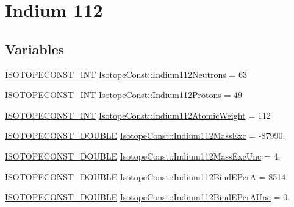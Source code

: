 \hypertarget{group___isotope_const-_indium-_in112}{}\section{Indium 112}
\label{group___isotope_const-_indium-_in112}
\subsection*{Variables}
\begin{DoxyCompactItemize}
\item 
\mbox{\hyperlink{group___isotope_const-_macros_ga5f18360b3e99483a35c32d789e62621c}{I\+S\+O\+T\+O\+P\+E\+C\+O\+N\+S\+T\+\_\+\+I\+NT}} \mbox{\hyperlink{group___isotope_const-_indium-_in112_gae919727f6b3f5c80d8d23961eab32aa6}{Isotope\+Const\+::\+Indium112\+Neutrons}} = 63
\item 
\mbox{\hyperlink{group___isotope_const-_macros_ga5f18360b3e99483a35c32d789e62621c}{I\+S\+O\+T\+O\+P\+E\+C\+O\+N\+S\+T\+\_\+\+I\+NT}} \mbox{\hyperlink{group___isotope_const-_indium-_in112_gaa73dd163a5b96491471405d681070d68}{Isotope\+Const\+::\+Indium112\+Protons}} = 49
\item 
\mbox{\hyperlink{group___isotope_const-_macros_ga5f18360b3e99483a35c32d789e62621c}{I\+S\+O\+T\+O\+P\+E\+C\+O\+N\+S\+T\+\_\+\+I\+NT}} \mbox{\hyperlink{group___isotope_const-_indium-_in112_ga358c507648f335595f76f39b1484c5a2}{Isotope\+Const\+::\+Indium112\+Atomic\+Weight}} = 112
\item 
\mbox{\hyperlink{group___isotope_const-_macros_ga8f45a7272ce02c0b4c65c44636ed719a}{I\+S\+O\+T\+O\+P\+E\+C\+O\+N\+S\+T\+\_\+\+D\+O\+U\+B\+LE}} \mbox{\hyperlink{group___isotope_const-_indium-_in112_ga10a142a463d1334fd455675d1e0e811d}{Isotope\+Const\+::\+Indium112\+Mass\+Exc}} = -\/87990.
\item 
\mbox{\hyperlink{group___isotope_const-_macros_ga8f45a7272ce02c0b4c65c44636ed719a}{I\+S\+O\+T\+O\+P\+E\+C\+O\+N\+S\+T\+\_\+\+D\+O\+U\+B\+LE}} \mbox{\hyperlink{group___isotope_const-_indium-_in112_ga80f90ef726d9a6c1fa15e2dfb15f4c8e}{Isotope\+Const\+::\+Indium112\+Mass\+Exc\+Unc}} = 4.
\item 
\mbox{\hyperlink{group___isotope_const-_macros_ga8f45a7272ce02c0b4c65c44636ed719a}{I\+S\+O\+T\+O\+P\+E\+C\+O\+N\+S\+T\+\_\+\+D\+O\+U\+B\+LE}} \mbox{\hyperlink{group___isotope_const-_indium-_in112_ga33b5b246f05b9b5eda6ae18d7c622cbe}{Isotope\+Const\+::\+Indium112\+Bind\+E\+PerA}} = 8514.
\item 
\mbox{\hyperlink{group___isotope_const-_macros_ga8f45a7272ce02c0b4c65c44636ed719a}{I\+S\+O\+T\+O\+P\+E\+C\+O\+N\+S\+T\+\_\+\+D\+O\+U\+B\+LE}} \mbox{\hyperlink{group___isotope_const-_indium-_in112_ga02214fbda861898a1c3e02c25d58d730}{Isotope\+Const\+::\+Indium112\+Bind\+E\+Per\+A\+Unc}} = 0.

\end{DoxyCompactItemize}
